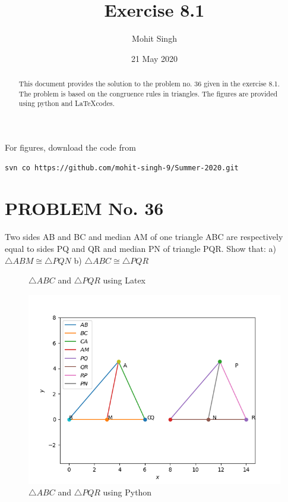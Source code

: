 \documentclass[journal,12pt,twocolumn]{IEEEtran}
\title{Exercise 8.1}
\author{Mohit Singh}
\date{21 May 2020}
\begin{document}
\maketitle{}


\begin{abstract}
This document provides the solution to the problem no. 36 given in the exercise 8.1. The problem is based on the congruence rules in triangles. The figures are provided using python and \LaTeX codes.
\end{abstract}

\noindent For figures, download the code from 
%
\begin{lstlisting}
svn co https://github.com/mohit-singh-9/Summer-2020.git
\end{lstlisting}
%

\section{PROBLEM No. 36}

\noindent Two sides AB and BC and median AM of one triangle ABC are respectively equal to sides PQ and QR and median PN of triangle PQR. Show that:
\newline
a) $\triangle ABM \cong \triangle PQN$
\newline 
b) $\triangle ABC \cong \triangle PQR$


\begin{figure}[!ht]
\centering
\resizebox{\columnwidth}{!}{}
\caption{$\triangle ABC$ and $\triangle PQR$ using Latex}
\label{fig:triangle_latex}
\end{figure}
\begin{figure}[!ht]
\centering
\includegraphics[width= \columnwidth]{Figure_1.png}
\caption{$\triangle ABC$ and $\triangle PQR$ using Python}
\label{fig:triangle_python}
\end{figure}
\end{document}
